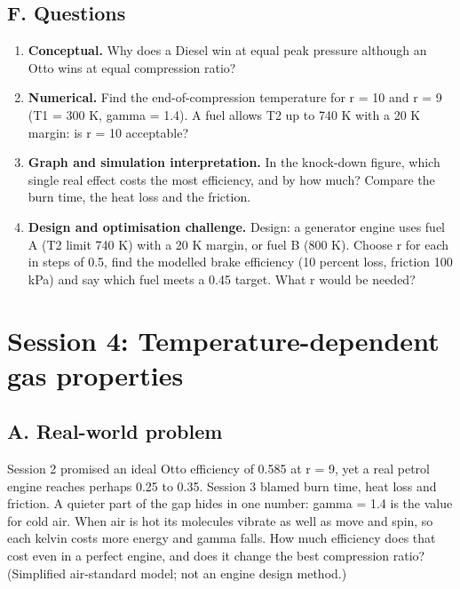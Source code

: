 \documentclass[11pt,a4paper]{article}
\begin{document}
\subsection*{F. Questions}
\begin{enumerate}[nosep]
\item \textbf{Conceptual.} Why does a Diesel win at equal peak pressure although an Otto wins at equal compression ratio?
\item \textbf{Numerical.} Find the end-of-compression temperature for r = 10 and r = 9 (T1 = 300 K, gamma = 1.4). A fuel allows T2 up to 740 K with a 20 K margin: is r = 10 acceptable?
\item \textbf{Graph and simulation interpretation.} In the knock-down figure, which single real effect costs the most efficiency, and by how much? Compare the burn time, the heat loss and the friction.
\item \textbf{Design and optimisation challenge.} Design: a generator engine uses fuel A (T2 limit 740 K) with a 20 K margin, or fuel B (800 K). Choose r for each in steps of 0.5, find the modelled brake efficiency (10 percent loss, friction 100 kPa) and say which fuel meets a 0.45 target. What r would be needed?
\end{enumerate}

\section{Session 4: Temperature-dependent gas properties}

\subsection*{A. Real-world problem}
Session 2 promised an ideal Otto efficiency of 0.585 at r = 9, yet a real petrol engine reaches perhaps 0.25 to 0.35. Session 3 blamed burn time, heat loss and friction. A quieter part of the gap hides in one number: gamma = 1.4 is the value for cold air. When air is hot its molecules vibrate as well as move and spin, so each kelvin costs more energy and gamma falls. How much efficiency does that cost even in a perfect engine, and does it change the best compression ratio? (Simplified air-standard model; not an engine design method.)
\end{document}
